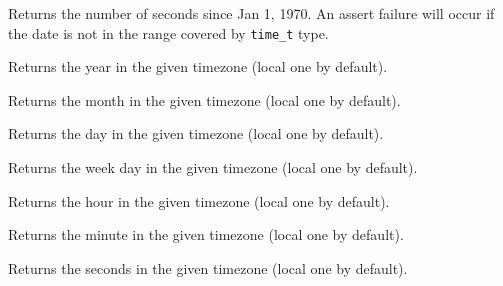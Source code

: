 \label{wxdatetimegetticks}


Returns the number of seconds since Jan 1, 1970. An assert failure will occur
if the date is not in the range covered by {\tt time\_t} type.

\label{wxdatetimegetyear}


Returns the year in the given timezone (local one by default).

\label{wxdatetimegetmonth}


Returns the month in the given timezone (local one by default).

\label{wxdatetimegetday}


Returns the day in the given timezone (local one by default).

\label{wxdatetimegetweekday}


Returns the week day in the given timezone (local one by default).

\label{wxdatetimegethour}


Returns the hour in the given timezone (local one by default).

\label{wxdatetimegetminute}


Returns the minute in the given timezone (local one by default).

\label{wxdatetimegetsecond}


Returns the seconds in the given timezone (local one by default).

